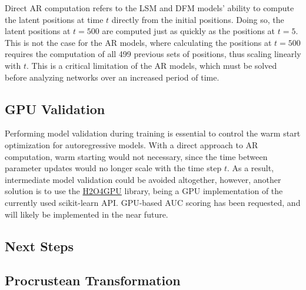         Direct AR computation refers to the LSM and DFM models' ability to compute the latent positions at time $t$ directly from the initial positions. Doing so, the latent positions at $t=500$ are computed just as quickly as the positions at $t=5$. This is not the case for the AR models, where calculating the positions at $t=500$ requires the computation of all 499 previous sets of positions, thus scaling linearly with $t$. This is a critical limitation of the AR models, which must be solved before analyzing networks over an increased period of time.
    
    \subsection{GPU Validation}
    
        Performing model validation during training is essential to control the warm start optimization for autoregressive models. With a direct approach to AR computation, warm starting would not necessary, since the time between parameter updates would no longer scale with the time step $t$. As a result, intermediate model validation could be avoided altogether, however, another solution is to use the \href{https://github.com/h2oai/h2o4gpu}{H2O4GPU} library, being a GPU implementation of the currently used scikit-learn API. GPU-based AUC scoring has been requested, and will likely be implemented in the near future.

    \subsection{Next Steps}
    
        
    \subsection{Procrustean Transformation}
    



